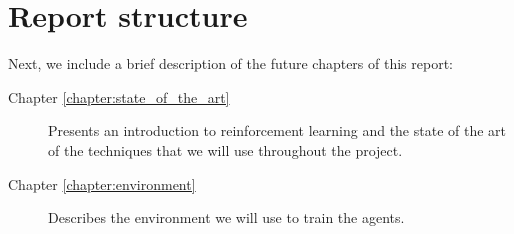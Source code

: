 \section{Report structure}

Next, we include a brief description of the future chapters of this report:

\begin{description}
    \item[Chapter \ref{chapter:state_of_the_art}] Presents an introduction to reinforcement learning and the state of the art of the techniques that we will use throughout the project.
    \item[Chapter \ref{chapter:environment}] Describes the environment we will use to train the agents.
\end{description}
